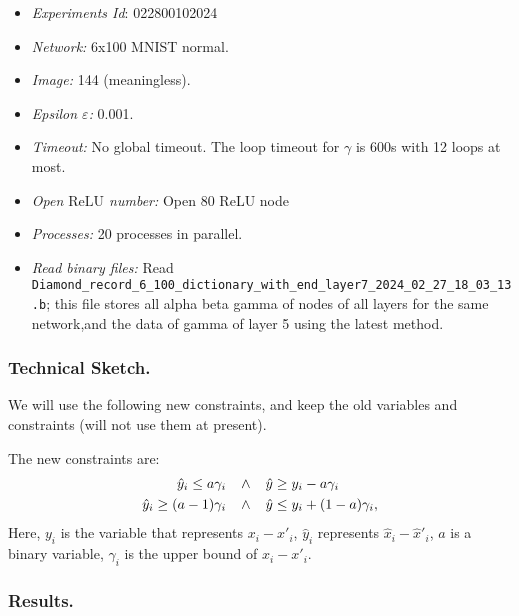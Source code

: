 \documentclass{llncs}
\newcommand{\ReLU}{\mathrm{ReLU}}
\begin{document}
\begin{itemize}
	\item\emph{Experiments Id}: 022800102024
	
	\item\emph{Network:} 6x100 MNIST normal. 
	
	\item\emph{Image:} 144 (meaningless).
	
	\item\emph{Epsilon $\varepsilon$:} 0.001.
	
	\item\emph{Timeout:} No global timeout. The loop timeout for $\gamma$ is 600s with 12 loops at most.
	
	\item\emph{Open $\ReLU$ number:} Open 80 ReLU node
	
	\item\emph{Processes:} 20 processes in parallel. 
	
	\item\emph{Read binary files:} Read \verb*|Diamond_record_6_100_dictionary_with_end_layer7_2024_02_27_18_03_13.b|; this file stores all alpha beta gamma of nodes of all layers for the same network,and the data of gamma of layer 5 using the latest method. 
\end{itemize}


\subsubsection*{Technical Sketch.}

We will use the following new constraints, and keep the old variables and constraints (will not use them at present).

The new constraints are: \begin{align*}
	\hat{y}_i \leq a \gamma_i \hspace*{2ex} &\wedge \hspace*{2ex}\hat{y} \geq y_i - a \gamma_i\\
	\hat{y}_i \geq (a-1) \gamma_i  \hspace*{2ex} &\wedge \hspace*{2ex} \hat{y} \leq y_i + (1-a) \gamma_i,
\end{align*} Here, $y_i$ is the variable that represents $x_i-x'_i$, $\hat{y}_i$ represents $\hat{x}_i-\hat{x}'_i$, $a$ is a binary variable, $\gamma_i$ is the upper bound of $x_i-x'_i$.



\subsubsection*{Results.}
\end{document}
